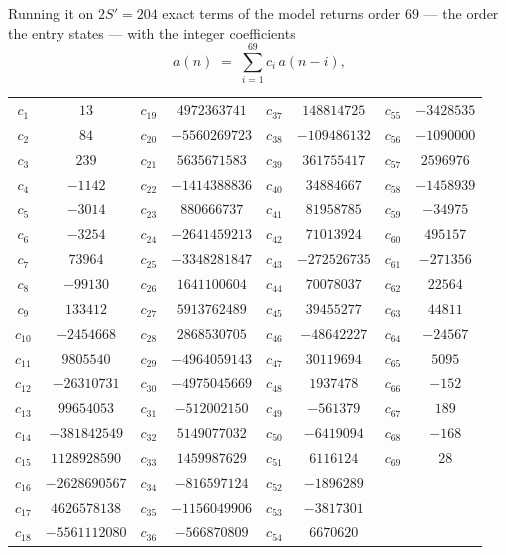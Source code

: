 \documentclass[11pt,a4paper]{article}
\theoremstyle{plain}
\theoremstyle{definition}
\begin{document}
Running it on $2S'=204$ exact terms of the model returns order $69$ --- the order the
entry states --- with the integer coefficients
\[
a(n)\;=\;\sum_{i=1}^{69}c_i\,a(n-i),
\]
\begin{center}\small
\begin{tabular}{cccccccc}
$c_{1}$ & $13$ & $c_{19}$ & $4972363741$ & $c_{37}$ & $148814725$ & $c_{55}$ & $-3428535$ \\
$c_{2}$ & $84$ & $c_{20}$ & $-5560269723$ & $c_{38}$ & $-109486132$ & $c_{56}$ & $-1090000$ \\
$c_{3}$ & $239$ & $c_{21}$ & $5635671583$ & $c_{39}$ & $361755417$ & $c_{57}$ & $2596976$ \\
$c_{4}$ & $-1142$ & $c_{22}$ & $-1414388836$ & $c_{40}$ & $34884667$ & $c_{58}$ & $-1458939$ \\
$c_{5}$ & $-3014$ & $c_{23}$ & $880666737$ & $c_{41}$ & $81958785$ & $c_{59}$ & $-34975$ \\
$c_{6}$ & $-3254$ & $c_{24}$ & $-2641459213$ & $c_{42}$ & $71013924$ & $c_{60}$ & $495157$ \\
$c_{7}$ & $73964$ & $c_{25}$ & $-3348281847$ & $c_{43}$ & $-272526735$ & $c_{61}$ & $-271356$ \\
$c_{8}$ & $-99130$ & $c_{26}$ & $1641100604$ & $c_{44}$ & $70078037$ & $c_{62}$ & $22564$ \\
$c_{9}$ & $133412$ & $c_{27}$ & $5913762489$ & $c_{45}$ & $39455277$ & $c_{63}$ & $44811$ \\
$c_{10}$ & $-2454668$ & $c_{28}$ & $2868530705$ & $c_{46}$ & $-48642227$ & $c_{64}$ & $-24567$ \\
$c_{11}$ & $9805540$ & $c_{29}$ & $-4964059143$ & $c_{47}$ & $30119694$ & $c_{65}$ & $5095$ \\
$c_{12}$ & $-26310731$ & $c_{30}$ & $-4975045669$ & $c_{48}$ & $1937478$ & $c_{66}$ & $-152$ \\
$c_{13}$ & $99654053$ & $c_{31}$ & $-512002150$ & $c_{49}$ & $-561379$ & $c_{67}$ & $189$ \\
$c_{14}$ & $-381842549$ & $c_{32}$ & $5149077032$ & $c_{50}$ & $-6419094$ & $c_{68}$ & $-168$ \\
$c_{15}$ & $1128928590$ & $c_{33}$ & $1459987629$ & $c_{51}$ & $6116124$ & $c_{69}$ & $28$ \\
$c_{16}$ & $-2628690567$ & $c_{34}$ & $-816597124$ & $c_{52}$ & $-1896289$ &  &  \\
$c_{17}$ & $4626578138$ & $c_{35}$ & $-1156049906$ & $c_{53}$ & $-3817301$ &  &  \\
$c_{18}$ & $-5561112080$ & $c_{36}$ & $-566870809$ & $c_{54}$ & $6670620$ &  &  \\
\end{tabular}
\end{center}
\end{document}
